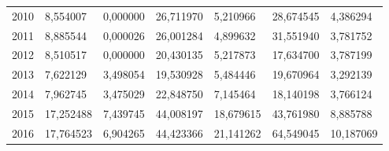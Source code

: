 \begin{table}
\begin{tabular}{p{1cm}p{2cm}p{2cm}p{2cm}p{2cm}p{2cm}p{2cm}}
 2010 &        8,554007 &            0,000000 &    26,711970 &                                    5,210966 &            28,674545 &                                     4,386294 \\
 2011 &        8,885544 &            0,000026 &    26,001284 &                                    4,899632 &            31,551940 &                                     3,781752 \\
 2012 &        8,510517 &            0,000000 &    20,430135 &                                    5,217873 &            17,634700 &                                     3,787199 \\
 2013 &        7,622129 &            3,498054 &    19,530928 &                                    5,484446 &            19,670964 &                                     3,292139 \\
 2014 &        7,962745 &            3,475029 &    22,848750 &                                    7,145464 &            18,140198 &                                     3,766124 \\
 2015 &       17,252488 &            7,439745 &    44,008197 &                                   18,679615 &            43,761980 &                                     8,885788 \\
 2016 &       17,764523 &            6,904265 &    44,423366 &                                   21,141262 &            64,549045 &                                    10,187069 \\
\bottomrule
\end{tabular}
\end{table}
